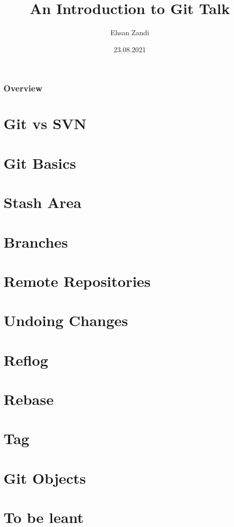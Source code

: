 \documentclass{beamer}
\title[Short title]{An Introduction to Git Talk} %
\author{Ehsan Zandi} %
\institute[DTIT] %
{
Deutsche Telekom IT \\ %
\medskip
ehsan.zandi@telekom.de
}
\date{23.08.2021} %
\begin{document}
\begin{frame}
\titlepage %
\end{frame}

\begin{frame}
\frametitle{Overview} %
\tableofcontents %
\end{frame}


\section{Git vs SVN} 
%
\section{Git Basics}





\section{Stash Area} 
\section{Branches} 
\section{Remote Repositories} 
\section{Undoing Changes} 
\section{Reflog}
\section{Rebase}
\section{Tag}
\section{Git Objects}
\section{To be leant}
\end{document}
